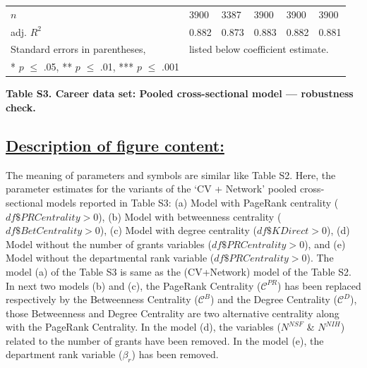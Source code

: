 \documentclass{article}\usepackage[]{graphicx}\usepackage[]{color}
\begin{document}
\begin{table}[h!]
\begin{center}
{\begin{tabular}{l l l l l l}
    \hline
    
    \rowcolor{gray!33} 
    $\textit{n}$
    & 3900 & 3387 & 3900 & 3900 & 3900 \\
    
    \rowcolor{gray!33} 
    adj. ${R^2}$ 
    & 0.882 & 0.873 & 0.883 & 0.882 & 0.881 \\
    
    \hline
    \hline
    
    Standard errors in parentheses, & \multicolumn{5}{l}{listed below coefficient estimate.} \\
    {* $\textit{p}$ $\leq$ .05, ** $\textit{p}$ $\leq$ .01, *** $\textit{p}$ $\leq$ .001}
    
  \end{tabular}%
  }
  \end{center}
\end{table}
\begin{center}
\par{\textbf{Table S3. Career data set: Pooled cross-sectional model --- robustness check.}}
\end{center}
\newpage
\subsection*{\underline{Description of figure content:}}
\par{
The meaning of parameters and symbols are similar like Table S2. Here, the parameter estimates for the variants of the ‘CV + Network’ pooled cross-sectional models reported in Table S3: (a) Model with PageRank centrality ($df\$PRCentrality > 0$), (b) Model with betweenness centrality ($df\$BetCentrality > 0$), (c) Model with degree centrality ($df\$KDirect > 0$), (d) Model without the number of grants variables ($df\$PRCentrality > 0$), and (e) Model without the departmental rank variable ($df\$PRCentrality > 0$). The model (a) of the Table S3 is same as the (CV+Network) model of the Table S2. In next two models (b) and (c), the PageRank Centrality ($\mathscr{C}^{PR}$) has been replaced respectively by the Betweenness Centrality ($\mathscr{C}^{B}$) and the Degree Centrality ($\mathscr{C}^{D}$), those Betweenness and Degree Centrality are two alternative centrality along with the PageRank Centrality. In the model (d), the variables (${N^{NSF}}$ \& ${N^{NIH}}$) related to the number of grants have been removed. In the model (e), the department rank variable ($\beta_{r}$) has been removed. 
}
\end{document}

